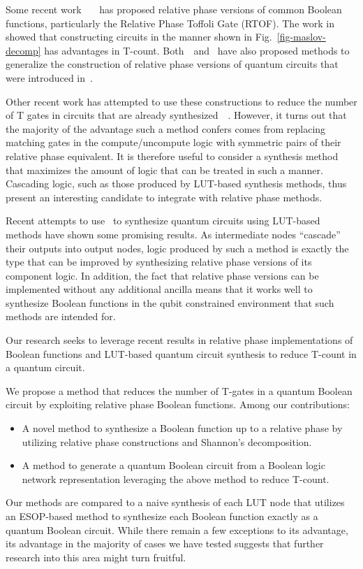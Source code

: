 Some recent work~\cite{bib-rtof-maslov}~\cite{bib-selinger-rtof}~\cite{bib-amy-phase-state} has proposed relative phase versions of common Boolean functions, particularly the Relative Phase Toffoli Gate (RTOF). The work in~\cite{bib-rtof-maslov} showed that constructing circuits in the manner shown in Fig.~\ref{fig-maslov-decomp} has advantages in T-count. Both~\cite{bib-rtof-maslov}~and~\cite{bib-amy-phase-state} have also proposed methods to generalize the construction of relative phase versions of quantum circuits that were introduced in~\cite{bib-selinger-rtof}.

Other recent work has attempted to use these constructions to reduce the number of T gates in circuits that are already synthesized~\cite{bib-sousai-rtof}~\cite{bib-dizzy-rtof}. However, it turns out that the majority of the advantage such a method confers comes from replacing matching gates in the compute/uncompute logic with symmetric pairs of their relative phase equivalent. It is therefore useful to consider a synthesis method that maximizes the amount of logic that can be treated in such a manner. Cascading logic, such as those produced by LUT-based synthesis methods, thus present an interesting candidate to integrate with relative phase methods.

Recent attempts to use~\cite{bib-lhrs-soeken} to synthesize quantum circuits using LUT-based methods have shown some promising results. As intermediate nodes ``cascade'' their outputs into output nodes, logic produced by such a method is exactly the type that can be improved by synthesizing relative phase versions of its component logic. In addition, the fact that relative phase versions can be implemented without any additional ancilla means that it works well to synthesize Boolean functions in the qubit constrained environment that such methods are intended for.

Our research seeks to leverage recent results in relative phase implementations of Boolean functions and LUT-based quantum circuit synthesis to reduce T-count in a quantum circuit.

We propose a method that reduces the number of T-gates in a quantum Boolean circuit by exploiting relative phase Boolean functions. Among our contributions:
\begin{itemize}
\item A novel method to synthesize a Boolean function up to a relative phase by utilizing relative phase constructions and Shannon's decomposition.
\item A method to generate a quantum Boolean circuit from a Boolean logic network representation leveraging the above method to reduce T-count.

\end{itemize}
Our methods are compared to a naive synthesis of each LUT node that utilizes an ESOP-based method to synthesize each Boolean function exactly as a quantum Boolean circuit. While there remain a few exceptions to its advantage, its advantage in the majority of cases we have tested suggests that further research into this area might turn fruitful.

